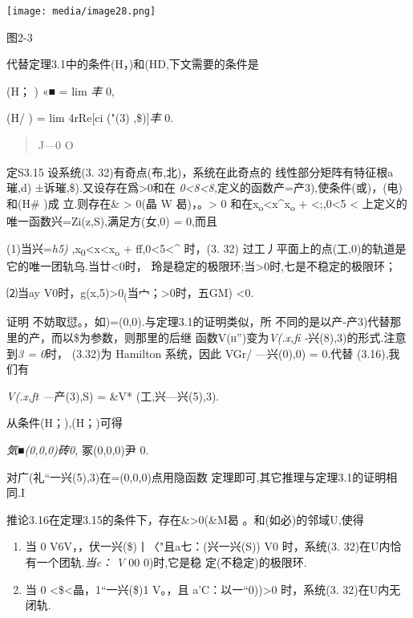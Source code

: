 \documentclass{article}
\begin{document}
\texttt{[image: media/image28.png]}

图2-3

代替定理3.1中的条件(H，)和(HD,下文需要的条件是

(H； ) «■ = lim \emph{丰} 0,

(H/ ) = lim 4rRe{[}ci ("(3) ,\$){]}\emph{丰} 0.

\begin{quote}
J---0 O
\end{quote}

定S3.15 设系统(3. 32)有奇点(布,北)，系统在此奇点的
线性部分矩阵有特征根a璀,d) ±诉璀,\$).又设存在爲\textgreater{}0和在
\emph{0\textless{}8\textless{}8,}定义的函数产=产3),使条件(或)，(电)和(H\#
)成 立.则存在\& \textgreater{} 0(晶 W 曷)，。\textgreater{} 0
和在x\textsubscript{o}\textless{}x\^{}x\textsubscript{o} +
\textless{};,0\textless{}5 \textless{}
上定义的唯一函数兴=Zi(z,S),满足方(女,0) = 0,而且

(1)当兴=\emph{h5)}
,x\textsubscript{0}\textless{}x\textless{}x\textsubscript{o} +
ff,0\textless{}5\textless{}\^{} 时，(3. 32)
过工丿平面上的点(工,0)的轨道是它的唯一团轨乌.当廿\textless{}0时，
玲是稳定的极限环;当\textgreater{}0时,七是不稳定的极限环；

⑵当ay
V0时，g(x,5)\textgreater{}0\textsubscript{(}当宀；\textgreater{}0时，五GM)
\textless{}0.

证明 不妨取愆。，如)=(0,0).与定理3.1的证明类似，所
不同的是以产-产3)代替那里的产，而以\$为参数，则那里的后继
函数\textsc{V(h'')}变为\emph{V(.x,fi -}兴(8),3)的形式.注意到\emph{3 =
0}时， (3.32)为 Hamilton 系统，因此 VGr/ ---兴(0),0) = 0.代替
(3.16),我们有

\emph{V(.x,ft ---}产(3),S) = \&V* (工,兴---兴(5),3).

从条件(H；),(H；)可得

\emph{気■(0,0,0)砖0,} 冢(0,0,0)尹 0.

对广(礼``一兴(5),3)在=(0,0,0)点用隐函数
定理即可,其它推理与定理3.1的证明相同.I

推论3.16在定理3.15的条件下，存在\&\textgreater{}0(\&M曷
。和(如必)的邻域U,使得

\begin{enumerate}
\def\labelenumi{(\arabic{enumi})}
\item
  当 0 V6V，，伏一兴(\$)丨〈"且a七：(兴一兴(S)) V0 时，系统(3.
  32)在U内恰有一个团轨.\emph{当c： V} 00 0)时,它是稳 定(不稳定)的极限环.
\item
  当 0 \textless{}\$\textless{}晶，1``一兴(\$)1 V。，且
  a'C：以一``0))\textgreater{}0 时，系统(3. 32)在U内无闭轨.\textbar{}
\end{enumerate}
\end{document}
